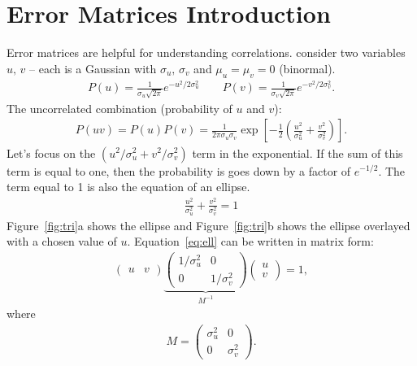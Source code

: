 \documentclass{article}
\begin{document}
\section{Error Matrices Introduction}
Error matrices are helpful for understanding correlations. consider two variables $u,\,v$ -- each is a Gaussian with $\sigma_u,\,\sigma_v$ and $\mu_u = \mu_v = 0$ (binormal).
\begin{align*}
  P(u) = \frac{1}{\sigma_u\sqrt{2\pi}}e^{-u^2/2\sigma_u^2} \qquad P(v) = \frac{1}{\sigma_v\sqrt{2\pi}}e^{-v^2/2\sigma_v^2}.
\end{align*}
The uncorrelated combination (probability of $u$ and $v$):
\begin{align}
  P(uv) = P(u)P(v) = \frac{1}{2\pi\sigma_u\sigma_v}\exp\left[-\frac{1}{2}\left(\frac{u^2}{\sigma_u^2}+\frac{v^2}{\sigma_v^2}\right)\right].
\end{align}
Let's focus on the $\left(u^2/\sigma_u^2 + v^2/\sigma_v^2\right)$ term in the exponential. If the sum of this term is equal to one, then the probability is goes down by a factor of $e^{-1/2}$. The term equal to 1 is also the equation of an ellipse.
\begin{align}
  \frac{u^2}{\sigma_u^2}+\frac{v^2}{\sigma_v^2} = 1
  \label{eq:ell}
\end{align}
Figure~\ref{fig:tri}a shows the ellipse and Figure~\ref{fig:tri}b shows the ellipse overlayed with a chosen value of $u$. Equation~\ref{eq:ell} can be written in matrix form:
\begin{align*}
  \begin{pmatrix}
    u                      & v
  \end{pmatrix}
  \underbrace{
    \begin{pmatrix}
      1/\sigma_u^2         & 0                                                                    \\
      0                    & 1/\sigma_v^2
  \end{pmatrix}}_{M^{-1}}
  \begin{pmatrix}
    u                                                                                             \\
    v
  \end{pmatrix}
  = 1,
\end{align*}
where
\begin{align}
  M = 
  \begin{pmatrix}
    \sigma_u^2             & 0                                                                    \\
    0                      & \sigma_v^2
  \end{pmatrix}.
\end{align}
\end{document}
